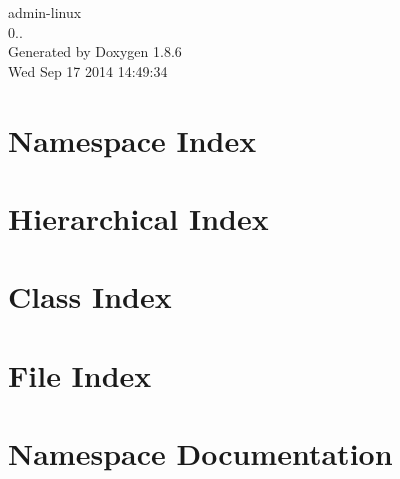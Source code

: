 \documentclass[twoside]{book}
\newcommand{\clearemptydoublepage}{%
  \newpage{\pagestyle{empty}\cleardoublepage}%
}
\begin{document}
\hypersetup{pageanchor=false}
\begin{titlepage}
\vspace*{7cm}
\begin{center}%
{\Large admin-\/linux \\[1ex]\large 0.. }\\
\vspace*{1cm}
{\large Generated by Doxygen 1.8.6}\\
\vspace*{0.5cm}
{\small Wed Sep 17 2014 14:49:34}\\
\end{center}
\end{titlepage}
\clearemptydoublepage
\tableofcontents
\clearemptydoublepage
{}
\hypersetup{pageanchor=true}

\chapter{Namespace Index}

\chapter{Hierarchical Index}

\chapter{Class Index}

\chapter{File Index}

\chapter{Namespace Documentation}






















\end{document}
